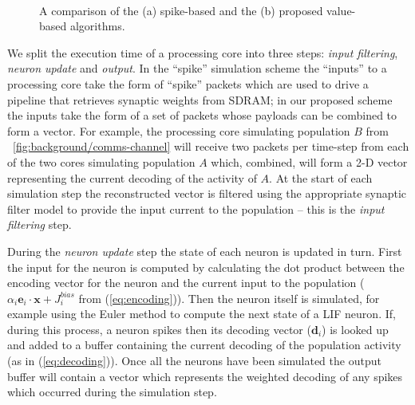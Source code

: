 \documentclass[conference]{IEEEtran}
\renewcommand{\vec}{\mathbf}  %
\begin{document}
  \begin{figure}
    \\
      \caption{A comparison of the (a) spike-based and the (b) proposed value-based algorithms.}
  \end{figure}


  We split the execution time of a processing core into three steps: \textit{input filtering}, \textit{neuron update} and \textit{output}.
  In the ``spike'' simulation scheme the ``inputs'' to a processing core take the form of ``spike'' packets which are used to drive a pipeline that retrieves synaptic weights from SDRAM; in our proposed scheme the inputs take the form of a set of packets whose payloads can be combined to form a vector.
  For example, the processing core simulating population $B$ from \figurename~\ref{fig:background/comms-channel} will receive two packets per time-step from each of the two cores simulating population $A$ which, combined, will form a 2-D vector representing the current decoding of the activity of $A$.
  At the start of each simulation step the reconstructed vector is filtered using the appropriate synaptic filter model to provide the input current to the population -- this is the \textit{input filtering} step.

  During the \textit{neuron update} step the state of each neuron is updated in turn.
  First the input for the neuron is computed by calculating the dot product between the encoding vector for the neuron and the current input to the population ($\alpha_i \vec{e}_i \cdot \vec{x} + J^{bias}_i$ from (\ref{eq:encoding})).
  Then the neuron itself is simulated, for example using the Euler method to compute the next state of a LIF neuron.
  If, during this process, a neuron spikes then its decoding vector ($\vec{d}_i$) is looked up and added to a buffer containing the current decoding of the population activity (as in (\ref{eq:decoding})).
  Once all the neurons have been simulated the output buffer will contain a vector which represents the weighted decoding of any spikes which occurred during the simulation step.
\end{document}
